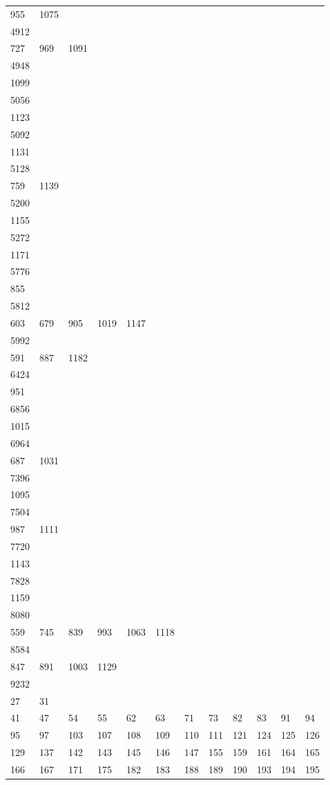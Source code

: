 \begin{longtable}{llllllllllll}
955& 1075& \\
4912&&&&&&&&&&&\\
727& 969& 1091& \\
4948&&&&&&&&&&&\\
1099\\
5056&&&&&&&&&&&\\
1123& \\
5092&&&&&&&&&&&\\
1131& \\
5128&&&&&&&&&&&\\
759& 1139& \\
5200&&&&&&&&&&&\\
1155& \\
5272&&&&&&&&&&&\\
1171& \\
5776&&&&&&&&&&&\\
855& \\
5812&&&&&&&&&&&\\
603& 679& 905& 1019& 1147\\
5992&&&&&&&&&&&\\
591& 887& 1182& \\
6424&&&&&&&&&&&\\
951& \\
6856&&&&&&&&&&&\\
1015& \\
6964&&&&&&&&&&&\\
687& 1031& \\
7396&&&&&&&&&&&\\
1095& \\
7504&&&&&&&&&&&\\
987& 1111& \\
7720&&&&&&&&&&&\\
1143& \\
7828&&&&&&&&&&&\\
1159\\
8080&&&&&&&&&&&\\
559& 745& 839& 993& 1063& 1118& \\
8584&&&&&&&&&&&\\
847& 891& 1003& 1129& \\
9232&&&&&&&&&&&\\
27& 31\\
41& 47& 54& 55& 62& 63& 71& 73& 82& 83& 91& 94\\
95& 97& 103& 107& 108& 109& 110& 111& 121& 124& 125& 126\\
129& 137& 142& 143& 145& 146& 147& 155& 159& 161& 164& 165\\
166& 167& 171& 175& 182& 183& 188& 189& 190& 193& 194& 195\\

\end{longtable}
